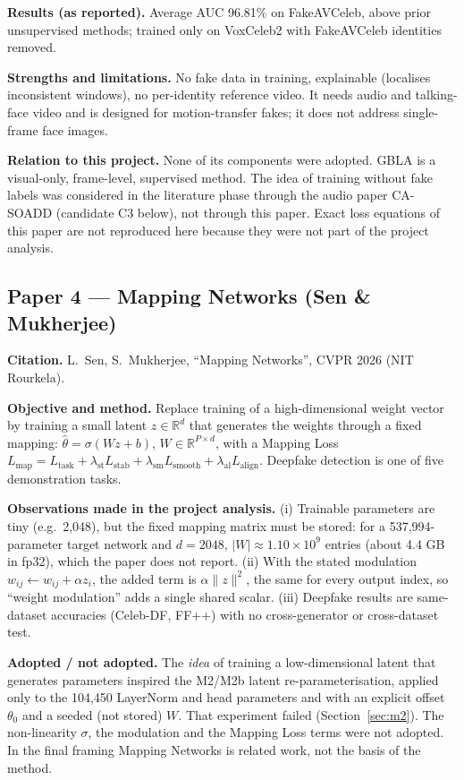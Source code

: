 \documentclass[10pt,a4paper]{article}
\begin{document}
\textbf{Results (as reported).} Average AUC 96.81\% on FakeAVCeleb, above prior unsupervised
methods; trained only on VoxCeleb2 with FakeAVCeleb identities removed.

\textbf{Strengths and limitations.} No fake data in training, explainable (localises inconsistent
windows), no per-identity reference video. It needs audio and talking-face video and is designed
for motion-transfer fakes; it does not address single-frame face images.

\textbf{Relation to this project.} None of its components were adopted. GBLA is a visual-only,
frame-level, supervised method. The idea of training without fake labels was considered in the
literature phase through the audio paper CA-SOADD (candidate C3 below), not through this paper.
Exact loss equations of this paper are not reproduced here because they were not part of the
project analysis.

\subsection{Paper 4 --- Mapping Networks (Sen \& Mukherjee)}\label{sec:mapping}
\textbf{Citation.} L.~Sen, S.~Mukherjee, ``Mapping Networks'', CVPR 2026 \cite{sen2026mapping}
(NIT Rourkela).

\textbf{Objective and method.} Replace training of a high-dimensional weight vector by training a
small latent \(z\in\mathbb{R}^d\) that generates the weights through a fixed mapping:
\(\hat\theta=\sigma(Wz+b)\), \(W\in\mathbb{R}^{P\times d}\), with a Mapping Loss
\(L_\text{map}=L_\text{task}+\lambda_\text{st}L_\text{stab}+\lambda_\text{sm}L_\text{smooth}+\lambda_\text{al}L_\text{align}\).
Deepfake detection is one of five demonstration tasks.

\textbf{Observations made in the project analysis.} (i) Trainable parameters are tiny (e.g.\ 2,048),
but the fixed mapping matrix must be stored: for a 537,994-parameter target network and
\(d=2048\), \(|W|\approx1.10\times10^9\) entries (about 4.4 GB in fp32), which the paper does not
report. (ii) With the stated modulation \(w_{ij}\leftarrow w_{ij}+\alpha z_i\), the added term is
\(\alpha\|z\|^2\), the same for every output index, so ``weight modulation'' adds a single shared
scalar. (iii) Deepfake results are same-dataset accuracies (Celeb-DF, FF++) with no cross-generator
or cross-dataset test.

\textbf{Adopted / not adopted.} The \emph{idea} of training a low-dimensional latent that generates
parameters inspired the M2/M2b latent re-parameterisation, applied only to the 104,450 LayerNorm and
head parameters and with an explicit offset \(\theta_0\) and a seeded (not stored) \(W\). That
experiment failed (Section~\ref{sec:m2}). The non-linearity \(\sigma\), the modulation and the Mapping
Loss terms were not adopted. In the final framing Mapping Networks is related work, not the basis of
the method.
\end{document}
